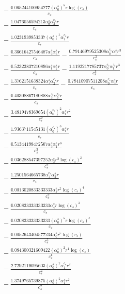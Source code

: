 \documentclass[10pt]{article}
\begin{document}
\begin{align*}
&{}  - \frac{0.065244100954277 \left(\alpha_{0}^s\right)^{5} r \log{\left(c_{s} \right)}}{c_{s}} \\
&{}  - \frac{1.0476056594213 \alpha_{0}^s \alpha_{3}^{c_s} r}{c_{s}} \\
&{}  - \frac{1.0231939853337 \left(\alpha_{0}^s\right)^{3} \alpha_{1}^{c_s} r}{c_{s}} \\
&{}  - \frac{0.36616427546487 \alpha_{0}^s \alpha_{3}^s r}{c_{s}} - \frac{0.79146979525308 \alpha_{0}^{c_s} \alpha_{1}^s r^{3}}{c_{s}^{3}} \\
&{}  - \frac{0.52323837210896 \alpha_{1}^s \alpha_{2}^s r}{c_{s}} - \frac{1.1192217785737 \alpha_{0}^{c_s} \alpha_{1}^{c_s} r^{3}}{c_{s}^{3}} \\
&{}  - \frac{1.3762151638324 \alpha_{1}^s \alpha_{2}^{c_s} r}{c_{s}} - \frac{0.79410907511208 \alpha_{0}^{c_s} \alpha_{3}^s r}{c_{s}} \\
&{}  - \frac{0.40308867180888 \alpha_{0}^{c_s} \alpha_{3}^{c_s} r}{c_{s}} \\
&{}  - \frac{3.4819478369654 \left(\alpha_{0}^{c_s}\right)^{2} \alpha_{1}^s r^{2}}{c_{s}^{2}} \\
&{}  - \frac{1.9363711545131 \left(\alpha_{0}^{c_s}\right)^{3} \alpha_{1}^s r}{c_{s}} \\
&{}  - \frac{0.51344198472507 \alpha_{0}^s \alpha_{1}^s r^{3}}{c_{s}^{3}} \\
&{}  - \frac{0.036288547397252 \alpha_{3}^s r^{2} \log{\left(c_{s} \right)}^{2}}{c_{s}^{2}} \\
&{}  - \frac{1.2501564665738 \alpha_{1}^{c_s} \alpha_{2}^s r}{c_{s}} \\
&{}  - \frac{0.0013020833333333 \alpha_{3}^s r^{2} \log{\left(c_{s} \right)}^{4}}{c_{s}^{2}} \\
&{}  - \frac{0.020833333333333 \alpha_{4}^s r \log{\left(c_{s} \right)}^{3}}{c_{s}} \\
&{}  - \frac{0.020833333333333 \left(\alpha_{0}^s\right)^{5} r \log{\left(c_{s} \right)}^{3}}{c_{s}} \\
&{}  - \frac{0.0052643404577234 \alpha_{0}^s r^{5} \log{\left(c_{s} \right)}}{c_{s}^{5}} \\
&{}  - \frac{0.084300321609422 \left(\alpha_{0}^s\right)^{2} r^{4} \log{\left(c_{s} \right)}}{c_{s}^{4}} \\
&{}  - \frac{2.7292119095603 \left(\alpha_{0}^s\right)^{2} \alpha_{1}^{c_s} r^{2}}{c_{s}^{2}} \\
&{}  - \frac{1.3749765739875 \left(\alpha_{0}^s\right)^{2} \alpha_{1}^s r^{2}}{c_{s}^{2}} \\

\end{align*}
\end{document}
